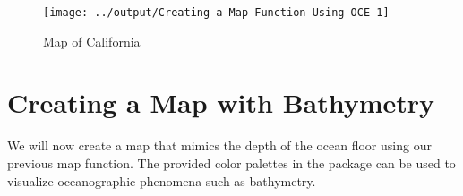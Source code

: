 \documentclass[]{tufte-handout}
\begin{document}
\begin{figure}
\texttt{[image: ../output/Creating a Map Function Using OCE-1]} \caption[Map of California]{Map of California}\label{fig:Creating a Map Function Using OCE}
\end{figure}

\hypertarget{creating-a-map-with-bathymetry}{%
\section{Creating a Map with
Bathymetry}\label{creating-a-map-with-bathymetry}}

We will now create a map that mimics the depth of the ocean floor using
our previous map function. The provided color palettes in the package
can be used to visualize oceanographic phenomena such as bathymetry.
\end{document}
